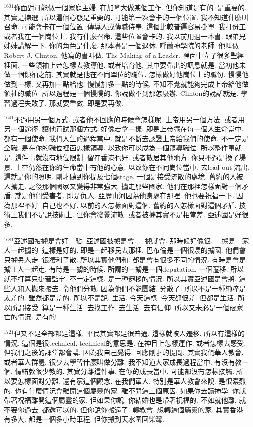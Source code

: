 \documentclass{book}
\begin{document}
$^{1601}$你面對可能做一個家庭主婦.
在加拿大做某個工作.
但你知道是有的.
是重要的.
其實是揀選.
所以這個心態是重要的.
可能第一次會卡的一個位置.
我不知道什麼叫召命.
可能會卡在一個位置.
傳導人或傳職侍奉.
這個比較普遍容易掛單.
我打份工.
或者我在一個崗位上.
我有什麼召命.
這些位置會卡的.
我以前用過一本書.
跟弟兄姊妹講解一下.
你的角色是什麼.
那本書是一個退休.
呼蘭神學院的老師.
他叫做Robert J. Clinton.
他寫的書叫做.
The Making of a Leader.
裡面中立了很多聖經裡面.
一些領袖上帝怎樣去教導他.
或者培育他.
其中要帶出的訊息就是.
當初他未做一個領袖之前.
其實就是他在不同單位的職位.
怎樣做好他崗位上的職份.
慢慢他做到一樣.
又再加一點給他.
慢慢加多一點的時候.
不知不覺就能夠完成上帝給他做領袖的職位.
所以過程是一個慢慢的.
你說做不到那怎麼辦.
Clinton的說話就是.
學習過程失敗了.
那就要重做.
即是要再做.

$^{1641}$不過用另一個方式.
或者他不回應的時候會怎樣呢.
上帝用另一個方法.
或者用另一個途徑.
讓他再試那個方式.
好像若拿一樣.
即是上帝擺在每一個人生命當中.
都有一個使命.
我們人生的過程當中.
就是不斷去認證上帝給我們的使命.
不一定是全職.
是在你的職位裡面怎樣領導.
以致你可以成為一個領導職位.
所以整件事就是.
這件事就沒有地位限制.
留在香港也好.
或者散居其他地方.
你只不過是換了場景.
上帝仍然在你的生命當中有他的心意.
以致你在不同崗位當中.
去lead out 流出.
這就是你的照明.
剛才聽到你提及七個stage.
一個是接受流散的處境.
舊約的人被人擄走.
之後那個國家又變得非常強大.
擄走那些國家.
他們在那裡怎樣面對一個矛盾.
就是他們受害者.
即是仇人.
亞歷山河因為他身處在那裡.
他也要祝福一下.
因為那裡不好.
自己也不好.
以前的人怎樣面對這個.
舊約的人怎樣面對這個矛盾.
技術上我們不是說技術上.
但你會發覺流散.
或者被擄其實不是相當差.
亞述國是好很多.

$^{1681}$亞述國被擄是會好一點.
亞述國被擄是會.
一擄就會.
那時候好像很.
一擄是一家人一起擄的.
這樣是好的.
即是一起移民去那裡.
巴布倫是一個很壞的擄國.
他們會只擄男人走.
很凄利子散.
所以其實他們和.
都是會有很多不同的情況.
有時是會是.
擄工人一起走.
有時是一擄的時候.
所謂的一擄是一個deputation.
一個遷移.
所以就不打算只掛著監牢.
不一定這樣.
是一種遷移的情況.
所以其實亞述國是會將.
這些人和人搬來搬去.
令他們分散.
因為他們不能團結.
分散了.
所以不是一種純粹是.
太差的.
雖然都是差的.
所以不是說.
生活.
今天這樣.
今天都很差.
但都是生活.
所以所謂接受.
算是一種生活.
去找工作.
去生活.
去有信仰.
所以又未必是一個破家亡的情況.
是有的.

$^{1721}$但又不是全部都是這樣.
平民其實都是很普通.
這樣就被人遷移.
所以有這樣的情況.
這個是很technical.
technical的意思是.
在神目上怎樣運作.
或者怎樣去感受.
但我們之後的課堂都會講.
因為我自己覺得.
回應剛才的提問.
其實我們華人教會.
或者華人群體.
很少去學習什麼叫做分離.
我不知道大家成長過程當中.
有沒有教一個.
情緒教很少教的.
其實分離這件事.
在你的成長當中.
可能都沒有怎樣接觸.
所以要怎樣面對分離.
還有家這個觀念.
在我們華人.
特別是華人教會來說.
是很濃烈的.
你有什麼情況會離開這個屬靈的家.
離不開這三個原因.
如果你去讀神學.
你就帶著祝福離開這個屬靈的家.
但如果你說.
你結婚也是帶著祝福的.
不如就他離.
就不要你過去.
都還可以的.
但你說你搬遠了.
轉教會.
想轉這個屬靈的家.
其實香港有多大.
都是一個多小時車程.
但你搬到天水圍回柴灣.
\end{document}
